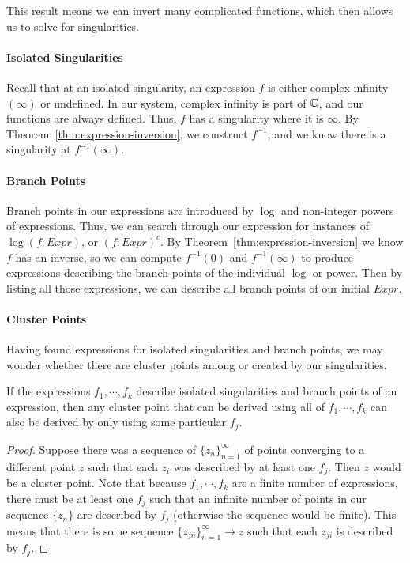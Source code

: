 This result means we can invert many complicated functions,
which then allows us to solve for singularities.

\paragraph{Isolated Singularities}
Recall that at an isolated singularity, an expression $f$ is either
complex infinity $(\infty)$ or undefined. In our system, complex infinity
is part of $\mathbb{C}$, and our functions are always defined. Thus, $f$
has a singularity where it is $\infty$. By
Theorem~\ref{thm:expression-inversion}, we construct $f^{-1}$, and we
know there is a singularity at $f^{-1}(\infty).$

\paragraph{Branch Points}
Branch points in our expressions are introduced by $\log$ and non-integer
powers of expressions. Thus, we can search through our expression for
instances of $\log(f: Expr)$, or $(f: Expr)^c$.
By Theorem~\ref{thm:expression-inversion} we know $f$ has an inverse,
so we can compute $f^{-1}(0)$ and $f^{-1}(\infty)$ to produce expressions
describing the branch points of the individual $\log$ or power. Then by
listing all those expressions, we can describe all branch points of our
initial $Expr$.


\paragraph{Cluster Points}
Having found expressions for isolated singularities and
branch points, we may wonder whether there are cluster points among or created
by our singularities.

\begin{lemma}
  If the expressions $f_1, \cdots, f_k$ describe isolated singularities
  and branch points of an expression, then any cluster point that can be
  derived using all of $f_1, \cdots, f_k$ can also be derived by only using
  some particular $f_j$.
\end{lemma}
\begin{proof}
  Suppose there was a sequence of $\{z_n\}_{n=1}^\infty$ of points converging to
  a different point $z$ such that each $z_i$ was described by at least one
  $f_j$.
  Then $z$ would be a cluster point. Note that because $f_1, \cdots, f_k$ are a
  finite number of expressions, there must be at least one $f_j$ such that an
  infinite number of points in our sequence $\{z_n\}$ are described by $f_j$
  (otherwise the sequence would be finite). This means that there is some
  sequence $\{z_{jn}\}_{n=1}^\infty \rightarrow z$ such that each $z_{ji}$ is
  described by $f_j$.
\end{proof}

